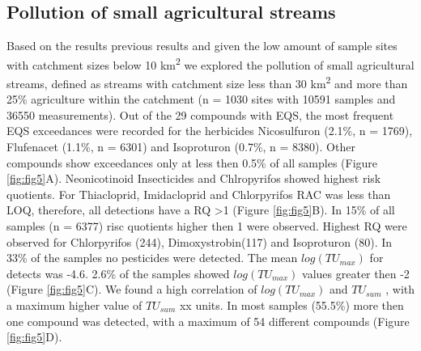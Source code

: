 \documentclass[journal=esthag,manuscript=article]{achemso}
\begin{document}
\subsection{Pollution of small agricultural streams}
Based on the results previous results and given the low amount of sample sites with catchment sizes below 10 km\textsuperscript{2} we explored the pollution of small agricultural streams, defined as streams with catchment size less than 30 km\textsuperscript{2} and more than 25\% agriculture within the catchment (n = 1030 sites with 10591 samples and 36550 measurements).
Out of the 29 compounds with EQS, the most frequent EQS exceedances were recorded for the herbicides Nicosulfuron (2.1\%, n = 1769), Flufenacet (1.1\%, n = 6301) and Isoproturon (0.7\%, n = 8380). 
Other compounds show exceedances only at less then 0.5\% of all samples (Figure \ref{fig:fig5}A).
Neonicotinoid Insecticides and Chlropyrifos showed highest risk quotients.
For Thiacloprid, Imidacloprid and Chlorpyrifos RAC was less than LOQ, therefore, all detections have a RQ \textgreater 1 (Figure \ref{fig:fig5}B). 
In 15\% of all samples (n = 6377) risc quotients higher then 1 were observed.
Highest RQ were observed for Chlorpyrifos (244), Dimoxystrobin(117) and Isoproturon (80). 
In 33\% of the samples no pesticides were detected. 
The mean $log(TU_{max})$ for detects was -4.6.
2.6\% of the samples showed $log(TU_{max})$ values greater then -2 (Figure \ref{fig:fig5}C).
We found a high correlation of $log(TU_{max})$ and $TU_{sum}$ , with a maximum higher value of $TU_{sum}$ xx units.
In most samples (55.5\%) more then one compound was detected, with a maximum of 54 different compounds (Figure \ref{fig:fig5}D). 

\end{document}

